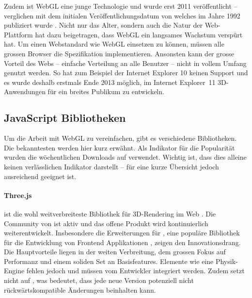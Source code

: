 Zudem ist WebGL eine junge Technologie und wurde erst 2011 veröffentlicht \cite{webGl1Spec} – verglichen mit dem initialen Veröffentlichungsdatum von  welches im Jahre 1992 publiziert wurde \cite{openGlSpec}.
Nicht nur das Alter, sondern auch die Natur der Web-Plattform hat dazu beigetragen, dass WebGL ein langsames Wachstum verspürt hat. Um einen Webstandard wie WebGL einsetzen zu können, müssen alle grossen Browser die Spezifikation implementieren. Ansonsten kann der grosse Vorteil des Webs – einfache Verteilung an alle Benutzer – nicht in vollem Umfang genutzt werden. So hat zum Beispiel der Internet Explorer 10 keinen Support und es wurde deshalb erstmals Ende 2013 möglich, im Internet Explorer 11 3D-Anwendungen für ein breites Publikum zu entwickeln.

\subsection{JavaScript Bibliotheken}
Um die Arbeit mit WebGL zu vereinfachen, gibt es verschiedene  Bibliotheken. Die bekanntesten werden hier kurz erwähnt. Als Indikator für die Popularität wurden die wöchentlichen Downloads auf  verwendet. Wichtig ist, dass dies alleine keinen verlässlichen Indikator darstellt – für eine kurze Übersicht jedoch ausreichend geeignet ist.

\paragraph{Three.js}
 ist die wohl weitverbreiteste Bibliothek für 3D-Rendering im Web \cite{threeNpmPackage}.
Die Community von  ist aktiv und das offene Produkt wird kontinuierlich weiterentwickelt. Insbesondere die Erweiterungen \cite{threeFiberGithub} für , eine populäre Bibliothek für die Entwicklung von Frontend Applikationen \cite{reactNpmPackage}, zeigen den Innovationsdrang.
Die Hauptvorteile liegen in der weiten Verbreitung, dem grossen Fokus auf Performanz und einem soliden Set an Basisfeatures. Elemente wie eine Physik-Engine fehlen jedoch und müssen vom Entwickler integriert werden. Zudem setzt  nicht auf , was bedeutet, dass jede neue Version potenziell nicht rückwärtskompatible Änderungen beinhalten kann.

